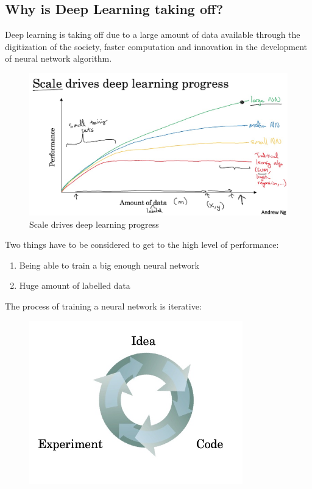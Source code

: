 \documentclass[UTF8]{article}
\begin{document}
\subsection{Why is Deep Learning taking off?}
Deep learning is taking off due to a large amount of data available through the digitization of the
society, faster computation and innovation in the development of neural network algorithm.
\begin{figure}[htb]
    \centering
    \includegraphics[width=40em]{figures/deep-nn-scale}
    \caption{Scale drives deep learning progress}
\end{figure}

Two things have to be considered to get to the high level of performance:
\begin{enumerate}
    \item Being able to train a big enough neural network
    \item Huge amount of labelled data
\end{enumerate}

The process of training a neural network is iterative:
\begin{figure}[htb]
    \centering
    \includegraphics[width=25em]{figures/train-nn-process}
\end{figure}
\end{document}

